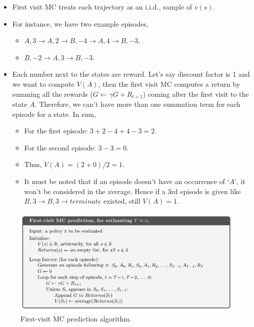 \begin{itemize}
	\item First visit MC treats each trajectory as an i.i.d., sample of $v(s)$.
	\item For instance, we have two example episodes, 
		\begin{itemize}
			\item $A, 3\to A, 2\to B, -4\to A, 4\to B, -3$.
			\item $B, -2\to A, 3\to B, -3$.
		\end{itemize} 
	\item Each number next to the states are reward. Let's say discount factor is 1 and we want to compute $V(A)$, then the first visit MC computes a return by summing all the rewards ($G\leftarrow \gamma G + R_{t+1}$) coming after the first visit to the state $A$. Therefore, we can't have more than one summation term for each episode for a state. In sum,
	\begin{itemize}
		\item For the first episode: $3+2-4+4-3=2$.
		\item For the second episode: $3-3=0$.
		\item Thus, $V(A) = (2+0)/2=1$.
		\item It must be noted that if an episode doesn't have an occurrence of `$A$', it won't be considered in the average. Hence if a 3rd episode is given like $B,3\to B,3\to terminate$ existed, still $V(A)=1$.
	\end{itemize}
\end{itemize}

\begin{figure}[h]
	\centering
	\includegraphics[scale=0.5]{./images/first_visit_mc.png}
	\caption{First-visit MC prediction algorithm.}
	\label{fig:first_visit_mc}
\end{figure}

